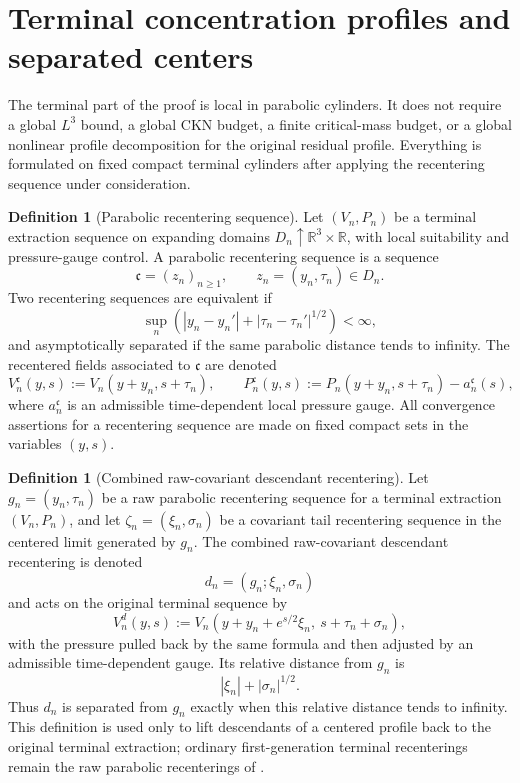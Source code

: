 \documentclass[11pt]{amsart}
\numberwithin{equation}{section}
\theoremstyle{plain}
\theoremstyle{definition}
\newtheorem{definition}[theorem]{Definition}
\theoremstyle{remark}
\newcommand{\R}{\mathbb R}
\begin{document}
\section{Terminal concentration profiles and separated centers}
\label{sec:terminal-concentration}

The terminal part of the proof is local in parabolic cylinders.  It does not require a
global \(L^3\) bound, a global CKN budget, a finite critical-mass budget, or a
global nonlinear profile decomposition for the original residual profile.
Everything is formulated on fixed compact terminal cylinders after applying the
recentering sequence under consideration.

\begin{definition}[Parabolic recentering sequence]
\label{def:parabolic-recentering-sequence}
Let \((V_n,P_n)\) be a terminal extraction sequence on expanding domains
\(D_n\uparrow \R^3\times\R\), with local suitability and pressure-gauge
control.  A parabolic recentering sequence is a sequence
\[
   \mathfrak c=(z_n)_{n\ge1},\qquad z_n=(y_n,\tau_n)\in D_n .
\]
Two recentering sequences are equivalent if
\[
   \sup_n\left(|y_n-y_n'|+|\tau_n-\tau_n'|^{1/2}\right)<\infty,
\]
and asymptotically separated if the same parabolic distance tends to infinity.
The recentered fields associated to \(\mathfrak c\) are denoted
\[
   V_n^{\mathfrak c}(y,s):=V_n(y+y_n,s+\tau_n),
   \qquad
   P_n^{\mathfrak c}(y,s):=
   P_n(y+y_n,s+\tau_n)-a_n^{\mathfrak c}(s),
\]
where \(a_n^{\mathfrak c}\) is an admissible time-dependent local pressure
gauge.  All convergence assertions for a recentering sequence are made on fixed
compact sets in the variables \((y,s)\).
\end{definition}

\begin{definition}[Combined raw-covariant descendant recentering]
\label{def:combined-raw-covariant-recentering}
Let \(g_n=(y_n,\tau_n)\) be a raw parabolic recentering sequence for a terminal
extraction \((V_n,P_n)\), and let \(\zeta_n=(\xi_n,\sigma_n)\) be a covariant
tail recentering sequence in the centered limit generated by \(g_n\).  The
combined raw-covariant descendant recentering is denoted
\[
   d_n=(g_n;\xi_n,\sigma_n)
\]
and acts on the original terminal sequence by
\[
   V_n^{d}(y,s)
   :=
   V_n(y+y_n+e^{s/2}\xi_n,\ s+\tau_n+\sigma_n),
\]
with the pressure pulled back by the same formula and then adjusted by an
admissible time-dependent gauge.  Its relative distance from \(g_n\) is
\[
   |\xi_n|+|\sigma_n|^{1/2}.
\]
Thus \(d_n\) is separated from \(g_n\) exactly when this relative distance tends
to infinity.  This definition is used only to lift descendants of a centered
profile back to the original terminal extraction; ordinary first-generation
terminal recenterings remain the raw parabolic recenterings of
.
\end{definition}
\end{document}
